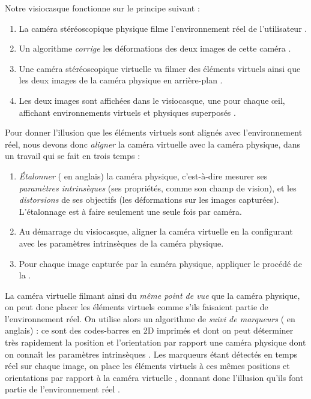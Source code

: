 Notre visiocasque fonctionne sur le principe suivant :
\begin{enumerate}
  \item La caméra stéréoscopique physique filme l'environnement réel de l'utilisateur .
  \item Un algorithme \emph{corrige} les déformations des deux images de cette caméra .
  \item Une caméra stéréoscopique virtuelle va filmer des éléments virtuels ainsi que les deux images de la caméra physique en arrière-plan .
  \item Les deux images sont affichées dans le visiocasque, une pour chaque œil, affichant environnements virtuels et physiques superposés .
\end{enumerate}
\medskip
Pour donner l'illusion que les éléments virtuels sont alignés avec l'environnement réel, nous devons donc \emph{aligner} la caméra virtuelle avec la caméra physique, dans un travail qui se fait en trois temps :
\begin{enumerate}
  \item \emph{Étalonner} ( en anglais) la caméra physique, c'est-à-dire mesurer ses \emph{paramètres intrinsèques} (ses propriétés, comme son champ de vision), et les \emph{distorsions} de ses objectifs (les déformations sur les images capturées). L'étalonnage est à faire seulement une seule fois par caméra.
  \item Au démarrage du visiocasque, aligner la caméra virtuelle en la configurant avec les paramètres intrinsèques de la caméra physique.
  \item Pour chaque image capturée par la caméra physique, appliquer le procédé de la .
\end{enumerate}
\medskip

La caméra virtuelle filmant ainsi du \emph{même point de vue} que la caméra physique, on peut donc placer les éléments virtuels comme s'ils faisaient partie de l'environnement réel. On utilise alors un algorithme de \emph{suivi de marqueurs} ( en anglais) : ce sont des codes-barres en 2D imprimés  et dont on peut déterminer très rapidement la position et l'orientation par rapport une caméra physique dont on connaît les paramètres intrinsèques \cite{Garrido-Jurado2014}. Les marqueurs étant détectés en temps réel sur chaque image, on place les éléments virtuels à ces mêmes positions et orientations par rapport à la caméra virtuelle , donnant donc l'illusion qu'ils font partie de l'environnement réel .

